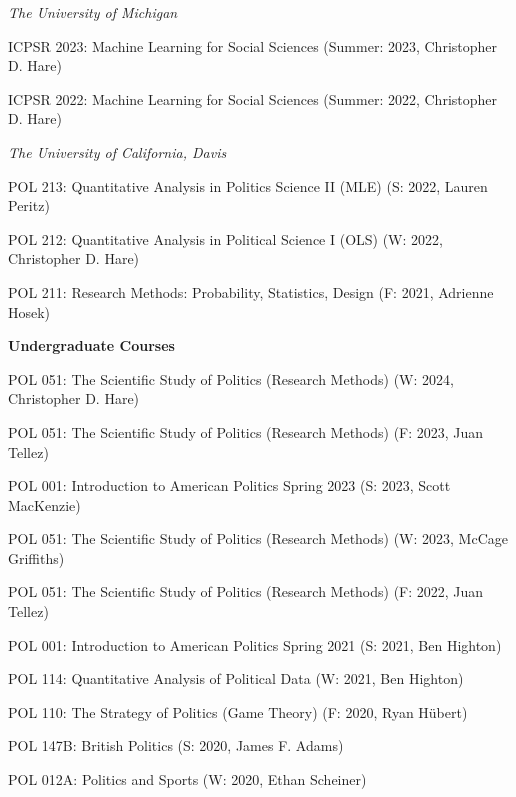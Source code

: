 \documentclass[
  11pt,
]
{article}
\renewenvironment{itemize}{
  \begin{list}{}{
    \setlength{\leftmargin}{1.5em}
  }
}{
  \end{list}
}
\begin{document}
\emph{The University of Michigan}

\begin{itemize}
\item
  ICPSR 2023: Machine Learning for Social Sciences (Summer: 2023,
  Christopher D. Hare)
\item
  ICPSR 2022: Machine Learning for Social Sciences (Summer: 2022,
  Christopher D. Hare)
\end{itemize}

\emph{The University of California, Davis}

\begin{itemize}
\item
  POL 213: Quantitative Analysis in Politics Science II (MLE) (S: 2022,
  Lauren Peritz)
\item
  POL 212: Quantitative Analysis in Political Science I (OLS) (W: 2022,
  Christopher D. Hare)
\item
  POL 211: Research Methods: Probability, Statistics, Design (F: 2021,
  Adrienne Hosek)
\end{itemize}

\textbf{Undergraduate Courses}

\begin{itemize}
\item
  POL 051: The Scientific Study of Politics (Research Methods) (W: 2024,
  Christopher D. Hare)
\item
  POL 051: The Scientific Study of Politics (Research Methods) (F: 2023,
  Juan Tellez)
\item
  POL 001: Introduction to American Politics Spring 2023 (S: 2023, Scott
  MacKenzie)
\item
  POL 051: The Scientific Study of Politics (Research Methods) (W: 2023,
  McCage Griffiths)
\item
  POL 051: The Scientific Study of Politics (Research Methods) (F: 2022,
  Juan Tellez)
\item
  POL 001: Introduction to American Politics Spring 2021 (S: 2021, Ben
  Highton)
\item
  POL 114: Quantitative Analysis of Political Data (W: 2021, Ben
  Highton)
\item
  POL 110: The Strategy of Politics (Game Theory) (F: 2020, Ryan Hübert)
\item
  POL 147B: British Politics (S: 2020, James F. Adams)
\item
  POL 012A: Politics and Sports (W: 2020, Ethan Scheiner)
\end{itemize}
\end{document}

